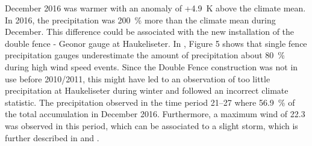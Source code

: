 December 2016 was warmer with an anomaly of +\SI{4.9}{\kelvin} above the climate mean. 
In 2016, the precipitation was \SI{200}{\percent} more than the climate mean during December. This difference could be associated with the new installation of the double fence - Geonor gauge at Haukeliseter. In \citet{wolff_derivation_2015}, Figure 5 shows that single fence precipitation gauges underestimate the amount of precipitation about \SI{80}{\percent} during high wind speed events. Since the Double Fence construction was not in use before 2010/2011, this might have led to an observation of too little precipitation at Haukeliseter during winter and followed an incorrect climate statistic.
The precipitation observed in the time period \SIrange{21}{27}{\dec} where \SI{56.9}{\percent} of the total accumulation in December 2016. Furthermore, a maximum wind of \SI{22.3}{\mPs} was observed in this period, which can be associated to a slight storm, which is further described in  and .
